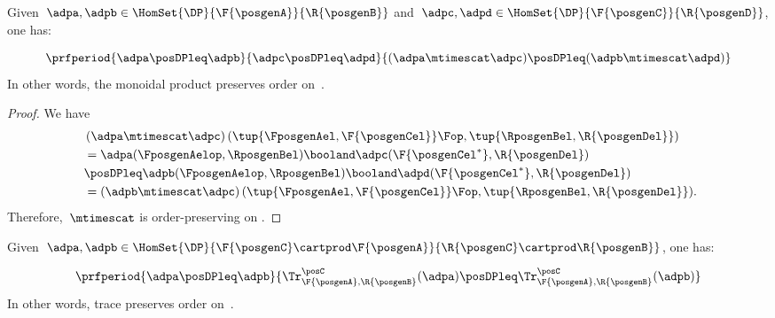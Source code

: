 \begin{lemma}
    \label{lem:tens_pres_order}
    Given~$\adpa,\adpb \in \HomSet{\DP}{\F{\posgenA}}{\R{\posgenB}}$ and~$\adpc,\adpd \in \HomSet{\DP}{\F{\posgenC}}{\R{\posgenD}}$, one has:

    \begin{equation}
        \prfperiod{
            \adpa\posDPleq \adpb
        }{
            \adpc\posDPleq \adpd
        }{
            (\adpa\mtimescat \adpc )\posDPleq (\adpb\mtimescat \adpd)
        }
    \end{equation}
    In other words, the monoidal product preserves order on~\DP.
\end{lemma}

\begin{proof}
    We have
    \begin{equation}
        \label{eq:tens_pres_ord}
        \begin{aligned}
            ~&\left( \adpa\mtimescat \adpc\right) (\tup{\FposgenAel,\F{\posgenCel}}\Fop,\tup{\RposgenBel,\R{\posgenDel}}) \\
            & = \adpa(\FposgenAelop,\RposgenBel)\booland \adpc(\F{\posgenCel^*},\R{\posgenDel})                                                                                                                                             \\
                                                                                                                        & \posDPleq \adpb(\FposgenAelop,\RposgenBel)\booland \adpd(\F{\posgenCel^*},\R{\posgenDel})                     \\
                                                                                                                        & =\left( \adpb\mtimescat \adpc\right) (\tup{\FposgenAel,\F{\posgenCel}}\Fop,\tup{\RposgenBel,\R{\posgenDel}}).
        \end{aligned}
    \end{equation}
    Therefore,~$\mtimescat$ is order-preserving on \DP.
\end{proof}

\begin{lemma}
    \label{lem:trace_pres_order}
    Given~$\adpa,\adpb\in \HomSet{\DP}{\F{\posgenC}\cartprod \F{\posgenA}}{\R{\posgenC}\cartprod \R{\posgenB}}$, one has:

    \begin{equation}
        \prfperiod{\adpa\posDPleq \adpb}{\Tr_{\F{\posgenA},\R{\posgenB}}^\posC(\adpa)\posDPleq \Tr_{\F{\posgenA},\R{\posgenB}}^\posC(\adpb)}
    \end{equation}
    In other words, trace preserves order on~\DP.
\end{lemma}

